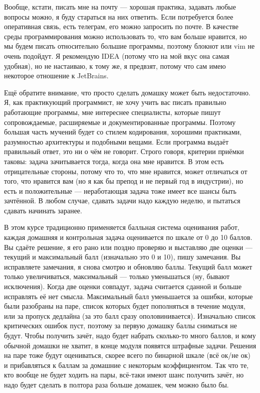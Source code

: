 \documentclass[a5paper]{article}
\begin{document}
Вообще, кстати, писать мне на почту --- хорошая практика, задавать любые вопросы можно, я буду стараться на них ответить. Если потребуется более оперативная связь, есть телеграм, его можно запросить по почте. В качестве среды программирования можно использовать то, что вам больше нравится, но мы будем писать относительно большие программы, поэтому блокнот или vim не очень подойдут. Я рекомендую IDEA (потому что на мой вкус она самая удобная), но не настаиваю, к тому же, я предвзят, потому что сам имею некоторое отношение к JetBrains.

Ещё обратите внимание, что просто сделать домашку может быть недостаточно. Я, как практикующий программист, не хочу учить вас писать правильно работающие программы, мне интереснее специалисты, которые пишут сопровождаемые, расширяемые и документированные программы. Поэтому большая часть мучений будет со стилем кодирования, хорошими практиками, разумностью архитектуры и подобными вещами. Если программа выдаёт правильный ответ, это ни о чём не говорит. Строго говоря, критерии приёмки таковы: задача зачитывается тогда, когда она мне нравится. В этом есть отрицательные стороны, потому что то, что мне нравится, может отличаться от того, что нравится вам (но я как бы препод и не первый год в индустрии), но есть и положительные --- неработающая задача тоже имеет все шансы быть зачтённой. В любом случае, сдавать задачи надо каждую неделю, и пытаться сдавать начинать заранее.

В этом курсе традиционно применяется балльная система оценивания работ, каждая домашняя и контрольная задача оценивается по шкале от 0 до 10 баллов. Вы сдаёте решение, я его рано или поздно проверяю и выставляю две оценки --- текущий и максимальный балл (изначально это 0 и 10), пишу замечания. Вы исправляете замечания, я снова смотрю и обновляю баллы. Текущий балл может только увеличиваться, максимальный --- только уменьшаться (ну, бывают исключения). Когда две оценки совпадут, задача считается сданной и больше исправлять её нет смысла. Максимальный балл уменьшается за ошибки, которые были разобраны на паре, список которых будет пополняться в течение модуля, или за пропуск дедлайна (за это балл сразу ополовинивается). Изначально список критических ошибок пуст, поэтому за первую домашку баллы сниматься не будут. Чтобы получить зачёт, надо будет набрать сколько-то много баллов, и кому обычной домашки не хватит, в конце модуля появятся штрафные задачи. Решения на паре тоже будут оцениваться, скорее всего по бинарной шкале (всё ок/не ок) и прибавляться к баллам за домашние с некоторым коэффициентом. Так что те, кто вообще не будет ходить на пары, всё-таки имеют шанс получить зачёт, но надо будет сделать в полтора раза больше домашек, чем можно было бы.
\end{document}
